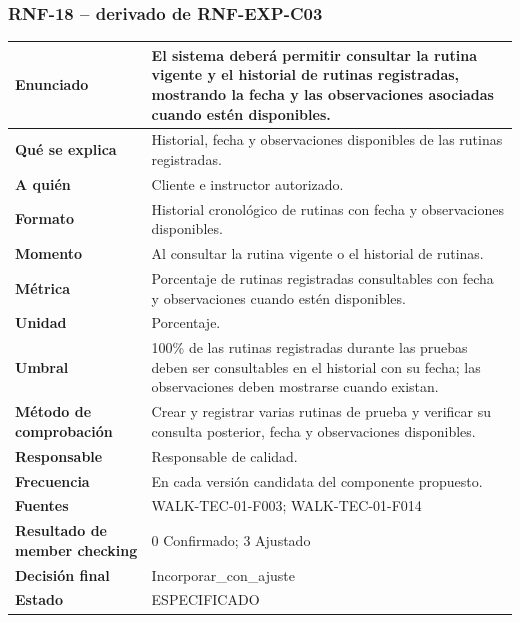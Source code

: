 \documentclass[11pt,a4paper,twoside]{article}
\begin{document}
\subsubsection{RNF-18 -- derivado de RNF-EXP-C03}
\begin{tabularx}{\textwidth}{|>{\bfseries}p{4.0cm}|X|}\hline
Enunciado & El sistema deberá permitir consultar la rutina vigente y el historial de rutinas registradas, mostrando la fecha y las observaciones asociadas cuando estén disponibles. \\ \hline
Qué se explica & Historial, fecha y observaciones disponibles de las rutinas registradas. \\ \hline
A quién & Cliente e instructor autorizado. \\ \hline
Formato & Historial cronológico de rutinas con fecha y observaciones disponibles. \\ \hline
Momento & Al consultar la rutina vigente o el historial de rutinas. \\ \hline
Métrica & Porcentaje de rutinas registradas consultables con fecha y observaciones cuando estén disponibles. \\ \hline
Unidad & Porcentaje. \\ \hline
Umbral & 100\% de las rutinas registradas durante las pruebas deben ser consultables en el historial con su fecha; las observaciones deben mostrarse cuando existan. \\ \hline
Método de comprobación & Crear y registrar varias rutinas de prueba y verificar su consulta posterior, fecha y observaciones disponibles. \\ \hline
Responsable & Responsable de calidad. \\ \hline
Frecuencia & En cada versión candidata del componente propuesto. \\ \hline
Fuentes & WALK-TEC-01-F003; WALK-TEC-01-F014 \\ \hline
Resultado de member checking & 0 Confirmado; 3 Ajustado \\ \hline
Decisión final & Incorporar\_con\_ajuste \\ \hline
Estado & ESPECIFICADO \\ \hline
\end{tabularx}
\end{document}
